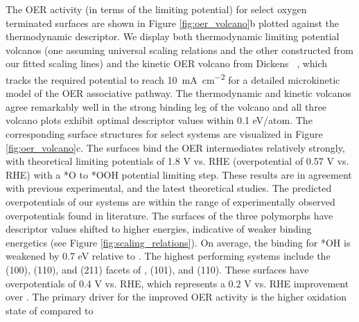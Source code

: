 %
The OER activity (in terms of the limiting potential) for select oxygen terminated surfaces are shown in Figure \ref{fig:oer_volcano}b plotted against the \DGOmOH thermodynamic descriptor.
%
We display both thermodynamic limiting potential volcanos 
(one assuming universal scaling relations and the other constructed from our fitted scaling lines)
and the kinetic OER volcano from Dickens ~\cite{Dickens2019},
which tracks the required potential to reach \SI[mode=text]{10}{\mA\per\cm\squared} for a detailed microkinetic model of the OER associative pathway.
%
The thermodynamic and kinetic volcanos agree remarkably well in the strong binding leg of the volcano and all three volcano plots exhibit optimal \DGOmOH descriptor values within \num{0.1} eV/atom.
%
The corresponding surface structures for select systems are visualized in Figure \ref{fig:oer_volcano}c.
%
The \rIrOtwo surfaces bind the OER intermediates relatively strongly,
with theoretical limiting potentials of \mytilde\num{1.8} V vs. RHE (overpotential of 0.57 V vs. RHE) with a *O to *OOH potential limiting step.
%
These results are in agreement with previous experimental, and the latest theoretical studies.
%
The predicted overpotentials of our \rIrOtwo systems are within the range of experimentally observed overpotentials found in literature.
%
The surfaces of the three \IrOthree polymorphs have \DGOmOH descriptor values shifted to higher energies, indicative of weaker binding energetics (see Figure \ref{fig:scaling_relations}).
%
On average, the binding for *OH is weakened by 0.7 eV relative to \IrOtwo.
%
The highest performing systems include the (100), (110), and (211) facets of \aIrOthree, \bIrOthree (101), and \rIrOthree (110).
%
These surfaces have overpotentials of \mytilde\num{0.4} V vs. RHE,
which represents a \mytilde\num{0.2} V vs. RHE improvement over \rIrOtwo.
%
The primary driver for the improved OER activity is the higher oxidation state of \IrOthree compared to \IrOtwo
